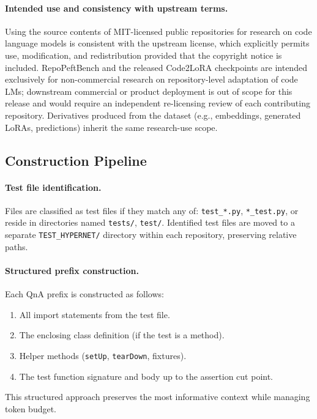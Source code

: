 \documentclass[11pt]{article}
\newcommand{\codelora}{Code2LoRA\xspace}
\newcommand{\repopeftbench}{RepoPeftBench\xspace}
\begin{document}
\paragraph{Intended use and consistency with upstream terms.}
Using the source contents of MIT-licensed public repositories for research on code language models is consistent with the upstream license, which explicitly permits use, modification, and redistribution provided that the copyright notice is included.
\repopeftbench{} and the released \codelora{} checkpoints are intended exclusively for non-commercial research on repository-level adaptation of code LMs; downstream commercial or product deployment is out of scope for this release and would require an independent re-licensing review of each contributing repository.
Derivatives produced from the dataset (e.g., embeddings, generated LoRAs, predictions) inherit the same research-use scope.

\subsection{Construction Pipeline}
\label{app:dataset:pipeline}

\paragraph{Test file identification.}
Files are classified as test files if they match any of:
\texttt{test\_*.py}, \texttt{*\_test.py}, or reside in directories named \texttt{tests/}, \texttt{test/}.
Identified test files are moved to a separate \texttt{TEST\_HYPERNET/} directory within each repository, preserving relative paths.

\paragraph{Structured prefix construction.}
Each QnA prefix is constructed as follows:
\begin{enumerate}[nosep]
\item All import statements from the test file.
\item The enclosing class definition (if the test is a method).
\item Helper methods (\texttt{setUp}, \texttt{tearDown}, fixtures).
\item The test function signature and body up to the assertion cut point.
\end{enumerate}
This structured approach preserves the most informative context while managing token budget.
\end{document}
